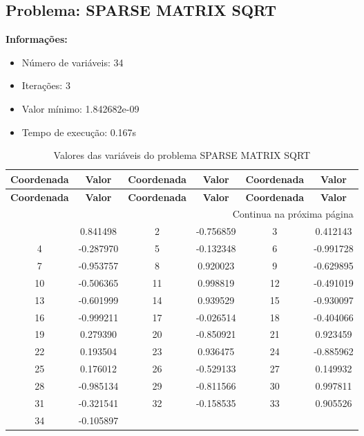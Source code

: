 \documentclass[12pt]{article}
\begin{document}
\newpage            
\subsection{Problema: SPARSE MATRIX SQRT}

\textbf{Informações:}
\begin{itemize}
\item Número de variáveis: 34
\item Iterações: 3
\item Valor mínimo: 1.842682e-09
\item Tempo de execução: 0.167s
\end{itemize}

\small
\begin{longtable}{@{}cc|cc|cc@{}}
\caption{Valores das variáveis do problema SPARSE MATRIX SQRT} \\
\toprule
\textbf{Coordenada} & \textbf{Valor} & \textbf{Coordenada} & \textbf{Valor} & \textbf{Coordenada} & \textbf{Valor} \\
\midrule
\endfirsthead

\toprule
\textbf{Coordenada} & \textbf{Valor} & \textbf{Coordenada} & \textbf{Valor} & \textbf{Coordenada} & \textbf{Valor} \\
\midrule
\endhead

\midrule \multicolumn{6}{r}{{Continua na próxima página}} \\ \midrule
\endfoot

\bottomrule
\endlastfoot
1 & 0.841498 & 2 & -0.756859 & 3 & 0.412143 \\
4 & -0.287970 & 5 & -0.132348 & 6 & -0.991728 \\
7 & -0.953757 & 8 & 0.920023 & 9 & -0.629895 \\
10 & -0.506365 & 11 & 0.998819 & 12 & -0.491019 \\
13 & -0.601999 & 14 & 0.939529 & 15 & -0.930097 \\
16 & -0.999211 & 17 & -0.026514 & 18 & -0.404066 \\
19 & 0.279390 & 20 & -0.850921 & 21 & 0.923459 \\
22 & 0.193504 & 23 & 0.936475 & 24 & -0.885962 \\
25 & 0.176012 & 26 & -0.529133 & 27 & 0.149932 \\
28 & -0.985134 & 29 & -0.811566 & 30 & 0.997811 \\
31 & -0.321541 & 32 & -0.158535 & 33 & 0.905526 \\
34 & -0.105897 &  &  &  &  \\

\end{longtable}
\end{document}
